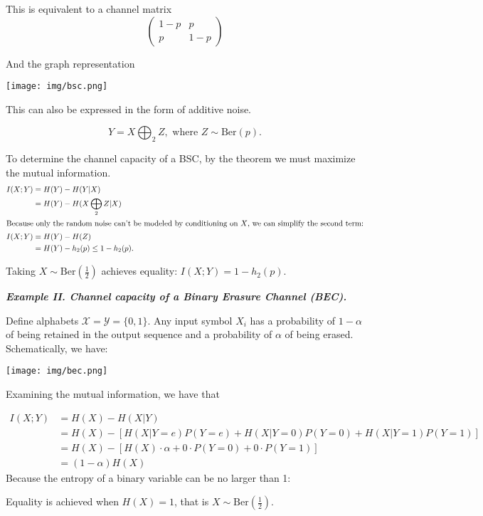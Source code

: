 This is equivalent to a channel matrix
\[
\begin{pmatrix}
1-p & p \\
p & 1 - p
\end{pmatrix}
\]

And the graph representation

\texttt{[image: img/bsc.png]}

This can also be expressed in the form of additive noise.

\[
Y = X \bigoplus_2 Z, \text{ where } Z \sim \text{Ber}(p).
\]

To determine the channel capacity of a BSC, by the theorem we must maximize the mutual information.
\begin{align*}
I(X; Y) &= H(Y) - H(Y|X) \\
		&= H(Y) - H(X \bigoplus_2 Z | X) \\
\intertext{Because only the random noise can't be modeled by conditioning on $X$, we can simplify the second term:}
I(X; Y) &= H(Y) - H(Z) \\
        &= H(Y) - h_2(p) \leq 1 - h_2(p).
\end{align*}

Taking $X \sim \text{Ber}(\frac{1}{2})$ achieves equality: $I(X; Y) = 1 - h_2(p)$.

\textbf{\textit{Example II. Channel capacity of a Binary Erasure Channel (BEC).}}

Define alphabets $\mathcal{X} = \mathcal{Y} = \{ 0, 1 \}$. Any input symbol $X_i$ has a probability of $1 - \alpha$ of being retained in the output sequence and a probability of $\alpha$ of being erased.  Schematically, we have:

\texttt{[image: img/bec.png]}

Examining the mutual information, we have that

\begin{align*}
I(X; Y) &= H(X) - H(X|Y) \\
		&= H(X) - [H(X | Y=e) P(Y=e) + H(X | Y=0) P(Y = 0) + H(X | Y=1) P(Y=1)] \\
        &= H(X) - [H(X) \cdot \alpha + 0 \cdot P(Y=0) + 0 \cdot P(Y=1)] \\
        &= (1 - \alpha) H(X)
\end{align*}
Because the entropy of a binary variable can be no larger than 1:

Equality is achieved when $H(X) = 1$, that is $X \sim \text{Ber}(\frac{1}{2})$.

